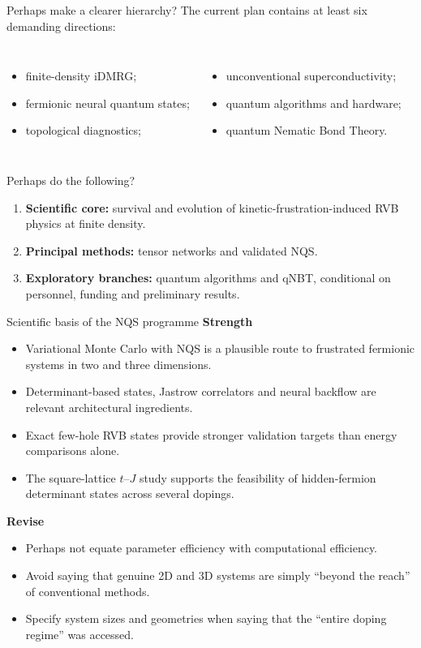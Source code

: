 \documentclass[aspectratio=169,11pt]{beamer}
\newcommand{\good}{\textcolor{green!45!black}{\textbf{Strength}}}
\newcommand{\revise}{\textcolor{warnred}{\textbf{Revise}}}
\begin{document}
\begin{frame}{Perhaps make a clearer hierarchy?}
The current plan contains at least six demanding directions:
\begin{columns}[T]
\begin{itemize}
  \item finite-density iDMRG;
  \item fermionic neural quantum states;
  \item topological diagnostics;
\end{itemize}
\begin{itemize}
  \item unconventional superconductivity;
  \item quantum algorithms and hardware;
  \item quantum Nematic Bond Theory.
\end{itemize}
\end{columns}

\begin{block}{Perhaps do the following?}
\begin{enumerate}
  \item \textbf{Scientific core:} survival and evolution of kinetic-frustration-induced RVB physics at finite density.
  \item \textbf{Principal methods:} tensor networks and validated NQS.
  \item \textbf{Exploratory branches:} quantum algorithms and qNBT, conditional on personnel, funding and preliminary results.
\end{enumerate}
\end{block}
\end{frame}

\begin{frame}{Scientific basis of the NQS programme}
\good
\begin{itemize}
  \item Variational Monte Carlo with NQS is a plausible route to frustrated fermionic systems in two and three dimensions.
  \item Determinant-based states, Jastrow correlators and neural backflow are relevant architectural ingredients.
  \item Exact few-hole RVB states provide stronger validation targets than energy comparisons alone.
  \item The square-lattice $t$--$J$ study supports the feasibility of hidden-fermion determinant states across several dopings.
\end{itemize}

\revise
\begin{itemize}
  \item Perhaps not  equate parameter efficiency with computational efficiency.
  \item Avoid saying that genuine 2D and 3D systems are simply ``beyond the reach'' of conventional methods.
  \item Specify system sizes and geometries when saying that the ``entire doping regime'' was accessed.
\end{itemize}
\end{frame}
\end{document}
